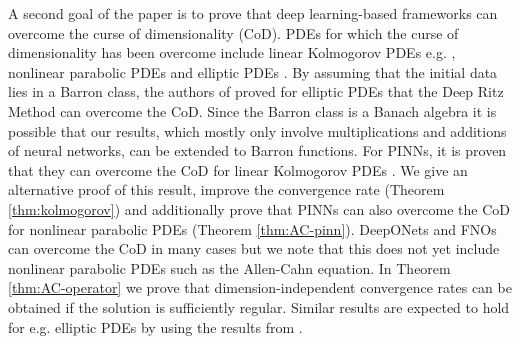 \documentclass{article}
\numberwithin{equation}{section}
\newcommand{\1}{\mathbbm{1}}
\begin{document}
A second goal of the paper is to prove that deep learning-based frameworks can overcome the curse of dimensionality (CoD). PDEs for which the curse of dimensionality has been overcome include linear Kolmogorov PDEs e.g. \cite{grohs2018proof, jentzen2018proof}, nonlinear parabolic PDEs \cite{hutzenthaler2020proof} and elliptic PDEs {\color{black}\cite{beck2020overcoming_elliptic, chen2021representation, marwah2021parametric}}. By assuming that the initial data lies in a Barron class, the authors of \cite{lu2021priori} proved for elliptic PDEs that the Deep Ritz Method \cite{e2018deep} can overcome the CoD. Since the Barron class is a Banach algebra \cite{chen2021representation} it is possible that our results, which mostly only involve multiplications and additions of neural networks, can be extended to Barron functions. For PINNs, it is proven that they can overcome the CoD for linear Kolmogorov PDEs \cite{deryck2021pinn}. We give an alternative proof of this result, improve the convergence rate (Theorem \ref{thm:kolmogorov}) and additionally prove that PINNs can also overcome the CoD for nonlinear parabolic PDEs (Theorem \ref{thm:AC-pinn}). DeepONets and FNOs can overcome the CoD in many cases \cite{LMK1, kovachki2021universal} but we note that this does not yet include nonlinear parabolic PDEs such as the Allen-Cahn equation. In Theorem \ref{thm:AC-operator} we prove that dimension-independent convergence rates can be obtained if the solution is sufficiently regular. {\color{black} Similar results are expected to hold for e.g. elliptic PDEs by using the results from \cite{beck2020overcoming_elliptic, chen2021representation, marwah2021parametric}.}


\end{document}
